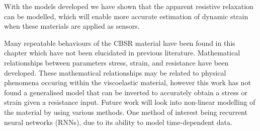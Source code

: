 With the models developed we have shown that the apparent resistive relaxation can be modelled, which will enable more accurate estimation of dynamic strain when these materials are applied as sensors. 

Many repeatable behaviours of the CBSR material have been found in this chapter which have not been elucidated in previous literature. Mathematical relationships between parameters stress, strain, and resistance have been developed. These mathematical relationships may be related to physical phenomena occuring within the viscoelastic material, however this work has not found a generalised model that can be inverted to accurately obtain a stress or strain given a resistance input. Future work will look into non-linear modelling of the material by using various methods. One method of interest being recurrent neural networks (RNNs), due to its ability to model time-dependent data.


